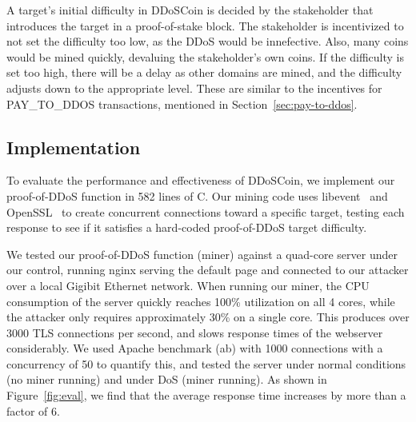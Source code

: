 %


A target's initial difficulty in DDoSCoin is decided by the stakeholder that
introduces the target in a proof-of-stake block. The stakeholder is incentivized to not
set the difficulty too low, as the DDoS would be innefective. Also, many coins would be
mined quickly, devaluing the stakeholder's own coins. If the difficulty is set too high,
there will be a delay as other domains are mined, and the difficulty adjusts down
to the appropriate level. These are similar to the incentives for PAY\_TO\_DDOS 
transactions, mentioned in Section~\ref{sec:pay-to-ddos}.








\subsection{Implementation}

\FigEval

To evaluate the performance and effectiveness of DDoSCoin, we implement our
proof-of-DDoS function in 582 lines of C. Our mining code uses
libevent~\cite{libevent} and OpenSSL~\cite{openssl} to create concurrent
connections toward a specific target, testing each response to see if it
satisfies a hard-coded proof-of-DDoS target difficulty.

We tested our proof-of-DDoS function (miner) against a quad-core server under
our control, running nginx serving the default page and connected to our
attacker over a local Gigibit Ethernet network. When running our miner, the CPU
consumption of the server quickly reaches 100\% utilization on all 4 cores,
while the attacker only requires approximately 30\% on a single core. This
produces over 3000 TLS connections per second, and slows response times of the
webserver considerably. We used Apache benchmark (ab) with 1000 connections with
a concurrency of 50 to quantify this, and tested the server under normal
conditions (no miner running) and under DoS (miner running). As shown in
Figure~\ref{fig:eval}, we find that the average response time increases by more
than a factor of 6.


